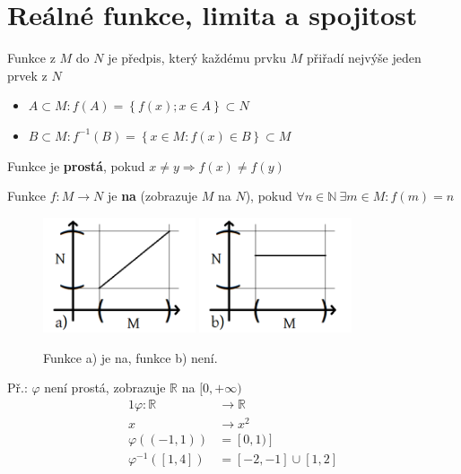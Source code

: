 \chapter{Reálné funkce, limita a spojitost}
Funkce z $M$ do $N$ je předpis, který každému prvku $M$ přiřadí nejvýše jeden \\ prvek z $N$
\begin{itemize}
    \item $A\subset M:f(A)=\left\{f(x); x\in A\right\}\subset N$
    \item $B\subset M:f^{-1}(B)=\left\{x\in M: f(x)\in B\right\}\subset M$
\end{itemize}

\begin{definition}
    Funkce je \textbf{prostá}, pokud $x\neq y \Rightarrow f(x)\neq f(y)$
\end{definition}

\begin{definition}
    Funkce $f:M\rightarrow N$ je \textbf{na} (zobrazuje $M$ na $N$), pokud
    $\forall n\in\mathbb{N}~\exists m\in M: f(m)=n$
    \begin{figure}[ht!]
        \begin{center}
            \includegraphics[width=0.4\textwidth,keepaspectratio]{../img/chapter2/surjectiveFunction.png}
            \includegraphics[width=0.4\textwidth,keepaspectratio]{../img/chapter2/surjectiveFunctionNOT.png}
            \caption{Funkce a) je na, funkce b) není.}
        \end{center}
    \end{figure}\FloatBarrier
    Př.: $\varphi$ není prostá, zobrazuje $\mathbb{R}$ na $[0,+\infty)$
    \begin{alignat}{1}
        \varphi:\mathbb{R}&\rightarrow\mathbb{R} \\
        x&\rightarrow x^2 \\
        \varphi((-1,1))&=[0,1)] \\
        \varphi^{-1}([1,4])&=[-2,-1]\cup[1,2]
    \end{alignat}
\end{definition}

